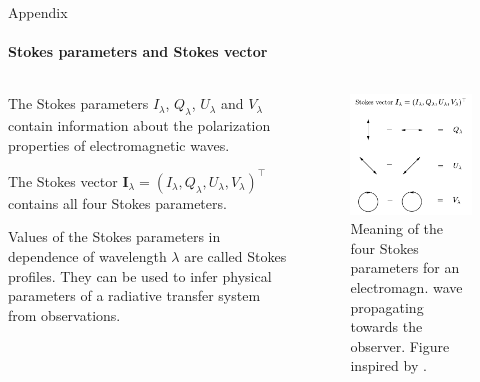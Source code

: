 \documentclass{beamer}
\newcommand\vect[1]{\ensuremath{\bm{#1}}}
\begin{document}
\begin{frame}[allowframebreaks]{Appendix}
	\framesubtitle{Stokes parameters and Stokes vector}
	\begin{columns}
		\begin{column}{0.6\textwidth}
			The Stokes parameters $I_\lambda$, $Q_\lambda$, $U_\lambda$ and $V_\lambda$ contain information about the polarization properties of electromagnetic waves.
			
			The Stokes vector $\vect{I}_\lambda = (I_\lambda, Q_\lambda, U_\lambda, V_\lambda)^\top$ contains all four Stokes parameters.
			
			Values of the Stokes parameters in dependence of wavelength $\lambda$ are called Stokes profiles. They can be used to infer physical parameters of a radiative transfer system from observations.
		\end{column}
		\begin{column}{0.4\textwidth}
			\begin{figure}[h]
				\centering
				\includegraphics[width=\textwidth]{figures/thesis/stokesvector.pdf}
				\caption{Meaning of the four Stokes parameters for an electromagn. wave propagating towards the observer. Figure inspired by \cite[p.17]{DeglInnocenti.2005}.}
				\label{fig:stokesvector}
			\end{figure}
		\end{column}
	\end{columns}
\end{frame}
\end{document}
